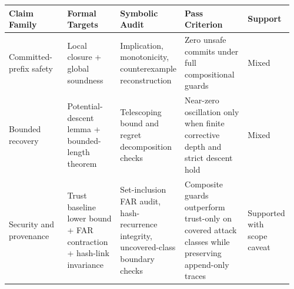 \begin{tabular}{p{0.23\linewidth}p{0.20\linewidth}p{0.19\linewidth}p{0.24\linewidth}p{0.10\linewidth}}
\hline
Claim Family & Formal Targets & Symbolic Audit & Pass Criterion & Support \\
\hline
Committed-prefix safety & Local closure + global soundness & Implication, monotonicity, counterexample reconstruction & Zero unsafe commits under full compositional guards & Mixed \\
Bounded recovery & Potential-descent lemma + bounded-length theorem & Telescoping bound and regret decomposition checks & Near-zero oscillation only when finite corrective depth and strict descent hold & Mixed \\
Security and provenance & Trust baseline lower bound + FAR contraction + hash-link invariance & Set-inclusion FAR audit, hash-recurrence integrity, uncovered-class boundary checks & Composite guards outperform trust-only on covered attack classes while preserving append-only traces & Supported with scope caveat \\
\hline
\end{tabular}
